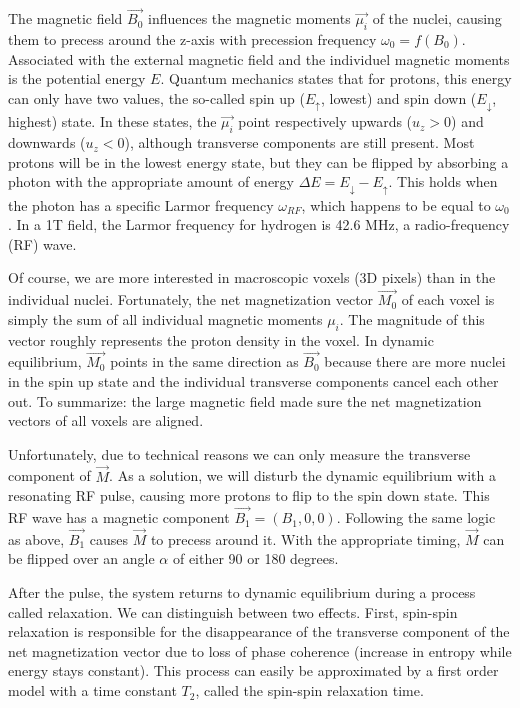 The magnetic field $\vec{B_0}$ influences the magnetic moments $\vec{\mu_i}$ of
the nuclei, causing them to precess around the z-axis with precession frequency
$\omega_0 = f(B_0)$. Associated with the external magnetic field and the
individuel magnetic moments is the potential energy $E$. Quantum mechanics
states that for protons, this energy can only have two values, the so-called
spin up ($E_\uparrow$, lowest) and spin down ($E_\downarrow$, highest) state. In
these states, the $\vec{\mu_i}$ point respectively upwards ($u_z > 0$) and
downwards ($u_z < 0$), although transverse components are still present. Most
protons will be in the lowest energy state, but they can be flipped by absorbing
a photon with the appropriate amount of energy $\Delta E = E_\downarrow -
E_\uparrow$. This holds when the photon has a specific Larmor frequency
$\omega_{RF}$, which happens to be equal to $\omega_0$. In a 1T field, the
Larmor frequency for hydrogen is 42.6 MHz, a radio-frequency (RF) wave.

Of course, we are more interested in macroscopic voxels (3D pixels) than in the
individual nuclei. Fortunately, the net magnetization vector $\vec{M_0}$ of each
voxel is simply the sum of all individual magnetic moments $\mu_i$. The
magnitude of this vector roughly represents the proton density in the voxel. In
dynamic equilibrium, $\vec{M_0}$ points in the same direction as $\vec{B_0}$
because there are more nuclei in the spin up state and the individual transverse
components cancel each other out. To summarize: the large magnetic field made
sure the net magnetization vectors of all voxels are aligned. 

Unfortunately, due to technical reasons we can only measure the transverse
component of $\vec{M}$. As a solution, we will disturb the dynamic equilibrium
with a resonating RF pulse, causing more protons to flip to the spin down state.
This RF wave has a magnetic component $\vec{B_1} = (B_1, 0, 0)$. Following the
same logic as above, $\vec{B_1}$ causes $\vec{M}$ to precess around it. With the
appropriate timing, $\vec{M}$ can be flipped over an angle $\alpha$ of either 90
or 180 degrees.

After the pulse, the system returns to dynamic equilibrium during a process
called relaxation. We can distinguish between two effects. First, spin-spin
relaxation is responsible for the disappearance of the transverse component of
the net magnetization vector due to loss of phase coherence (increase in
entropy while energy stays constant). This process can easily be approximated
by a first order model with a time constant $T_2$, called the spin-spin
relaxation time.

